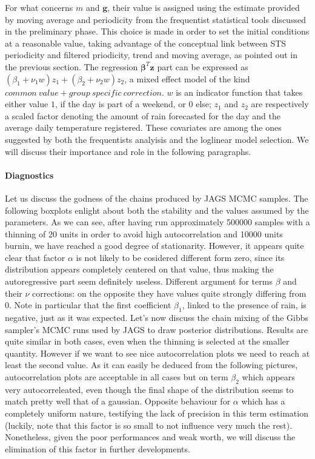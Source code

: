 \documentclass[11pt,twoside]{report}
\begin{document}
For what concerns $ m $ and $ \mathbf{g} $, their value is assigned using the estimate provided by moving average and periodicity from the frequentist statistical tools discussed in the preliminary phase. This choice is made in order to set the initial conditions at a reasonable value, taking advantage of the conceptual link between STS periodicity and filtered priodicity, trend and moving average, as pointed out in the previous section. The regression $ \boldsymbol{\beta}^T\mathbf{z} $ part can be expressed as $ (\beta_1+\nu_1w)z_1 + (\beta_2+\nu_2w)z_2$, a mixed effect model of the kind $ \mathit{common\ value + group\ specific\ correction} $. $ w $ is an indicator function that takes either value $ 1 $, if the day is part of a weekend, or $ 0 $ else; $ z_1 $ and $ z_2 $ are respectively a scaled factor denoting the amount of rain forecasted for the day and the average daily temperature registered. These covariates are among the ones suggested by both the frequentists analyisis and the loglinear model selection. We will discuss their importance and role in the following paragraphs.

\paragraph{Diagnostics}
Let us discuss the godness of the chains produced by JAGS MCMC samples.
The following boxplots enlight about both the stability and the values assumed by the parameters. As we can see, after having run approximately 500000 samples with a thinning of 20 units in order to avoid high autocorrelation and 10000 units burnin, we have reached a good degree of stationarity. However, it appears quite clear that factor $ \alpha $ is not likely to be cosidered different form zero, since its distribution appears completely centered on that value, thus making the autoregressive part seem definitely useless. Different argument for terms $ \beta $ and their $ \nu $ corrections: on the opposite they have values quite strongly differing from 0. Note in particular that the first coefficient $ \beta_1 $, linked to the presence of rain, is negative, just as it was expected.  Let's now discuss the chain mixing of the Gibbs sampler's MCMC runs used by JAGS to draw posterior distributions. Results are quite similar in both cases, even when the thinning is selected at the smaller quantity. However if we want to see nice autocorrelation plots we need to reach at least the second value. As it can easily be deduced from the following pictures, autocorrelation plots are acceptable in all cases but on term $ \beta_2 $ which appears very autocorreleated, even though the final shape of the distribution seems to match pretty well that of a gaussian. Opposite behaviour for $ \alpha $ which has a completely uniform nature, testifying the lack of precision in this term estimation (luckily, note that this factor is so small to not influence very much the rest). Nonetheless, given the poor performances and weak worth, we will discuss the elimination of this factor in further developments.
\end{document}
